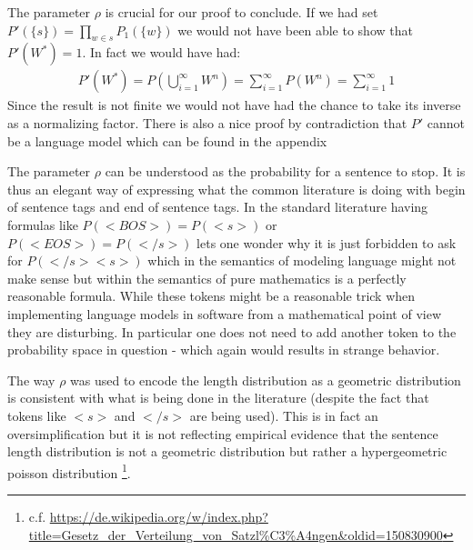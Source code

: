 \documentclass[•]{book}
\begin{document}
\begin{remark}
The parameter $\rho$ is crucial for our proof to conclude.
If we had set $P'(\{s\}) = \prod_{w\in s}P_1(\{w\})$ we would not have been able to show that $P'(W^{*})=1$. 
In fact we would have had:
\begin{align}
P'(W^{*})= P(\bigcup_{i=1}^\infty W^n) = \sum_{i=1}^\infty P(W^n) = \sum_{i=1}^\infty 1
\end{align}
Since the result is not finite we would not have had the chance to take its inverse as a normalizing factor. 
There is also a nice proof by contradiction that $P'$ cannot be a language model which can be found in the appendix 

The parameter $\rho$ can be understood as the probability for a sentence to stop. 
It is thus an elegant way of expressing what the common literature is doing with begin of sentence tags and end of sentence tags.
In the standard literature having formulas like $P(<BOS>)=P(<s>)$ or $P(<EOS>)=P(</s>)$ lets one wonder why it is just forbidden to ask for $P(</s><s>)$ which in the semantics of modeling language might not make sense but within the semantics of pure mathematics is a perfectly reasonable formula.
While these tokens might be a reasonable trick when implementing language models in software from a mathematical point of view they are disturbing.
In particular one does not need to add another token to the probability space in question - which again would results in strange behavior.   

The way $\rho$ was used to encode the length distribution as a geometric distribution is consistent with what is being done in the literature (despite the fact that tokens like $<s>$ and $</s>$ are being used). This is in fact an oversimplification but it is not reflecting empirical evidence that the sentence length distribution is not a geometric distribution but rather a hypergeometric poisson distribution \footnote{c.f. \url{https://de.wikipedia.org/w/index.php?title=Gesetz_der_Verteilung_von_Satzl\%C3\%A4ngen&oldid=150830900}}.

\end{remark}
\end{document}
